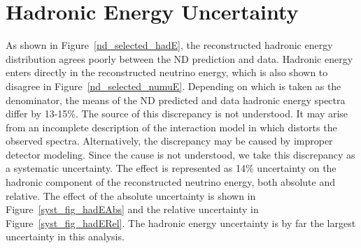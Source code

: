 {\begin{figure}
\end{figure}

\clearpage
\section{Hadronic Energy Uncertainty}

As shown in Figure~\ref{nd_selected_hadE}, the reconstructed hadronic
energy distribution agrees poorly between the ND prediction and data.
Hadronic energy enters directly in the reconstructed neutrino energy,
which is also shown to disagree in Figure~\ref{nd_selected_numuE}.
Depending on which is taken as the denominator,
the means of the ND predicted and data hadronic energy spectra
differ by 13-15\%.
The source of this discrepancy is not understood.
It may arise from an incomplete description of the interaction model
in \genie which distorts the observed spectra.
Alternatively, the discrepancy may be caused by improper detector modeling.
Since the cause is not understood, we take this discrepancy as a
systematic uncertainty.
The effect is represented as 14\% uncertainty on the hadronic
component of the reconstructed neutrino energy, both absolute and relative.
The effect of the absolute uncertainty is shown in
Figure~\ref{syst_fig_hadEAbs} and the relative uncertainty in
Figure~\ref{syst_fig_hadERel}.
The hadronic energy uncertainty is by far the largest uncertainty in this
analysis.

}
